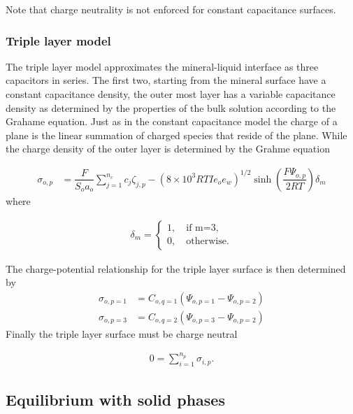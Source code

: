 \documentclass{article}
\begin{document}
Note that charge neutrality is not enforced for constant capacitance surfaces. 
\subsubsection{Triple layer model}

The triple layer model approximates the mineral-liquid interface as three capacitors in series. The first two, starting from the mineral surface have a constant capacitance density, the outer most layer has a variable capacitance density as determined by the properties of the bulk solution according to the Grahame equation. Just as in the constant capacitance model the charge of a plane is the linear summation of charged species that reside of the plane. While the charge density of the outer layer is determined by the Grahme equation

\begin{align}
\sigma_{o,p} &= \dfrac{F}{S_o a_o}\sum_{j=1}^{n_c}c_j\zeta_{j,p} - (8\times10^3 R T I e_o e_w)^{1/2}\sinh\left(\dfrac{F\Psi_{o,p}}{2RT}\right)\delta_m\label{eq:charge}
\end{align}
where 

\begin{align}
\delta_m = \begin{cases}
1, \quad\text{if m=3},\\
0, \quad\text{otherwise}.
\end{cases}
\end{align}

The charge-potential relationship for the triple layer surface is then determined by
\begin{align}
\sigma_{o,p=1}  &= C_{o,q=1}\left(\Psi_{o,p=1} -\Psi_{o,p=2}\right)\label{eq:pot1}\\
\sigma_{o,p=3}  &= C_{o,q=2}\left(\Psi_{o,p=3} -\Psi_{o,p=2}\right)\label{eq:pot2}
\end{align}
Finally the triple layer surface must be charge neutral

\begin{align}
    0 = \sum_{i=1}^{n_p} \sigma_{i,p}.\label{eq:neutral}
\end{align}

\subsection{Equilibrium with solid phases}
\end{document}
